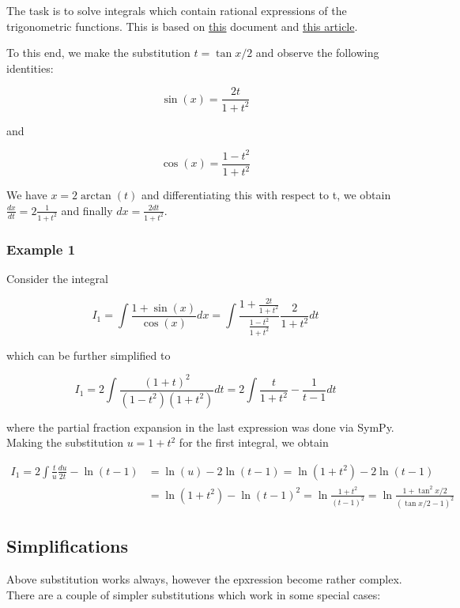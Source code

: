 
The task is to solve integrals which contain rational expressions of the
trigonometric functions. This is based on
\href{http://planetmath.org/sites/default/files/texpdf/39380.pdf}{this}
document and
\href{https://en.wikipedia.org/wiki/Tangent_half-angle_substitution}{this
article}.

To this end, we make the substitution \(t = \tan x/2\) and observe the
following identities:

\[
\sin(x) = \frac{2t}{1+t^2}
\]

and

\[
\cos(x) = \frac{1-t^2}{1+t^2}
\]

We have \(x = 2 \arctan(t)\) and differentiating this with respect to t,
we obtain \(\frac{dx}{dt} = 2 \frac{1}{1+t^2}\) and finally
\(dx = \frac{2 dt}{1+t^2}\).

\subsubsection{Example 1}

Consider the integral

\[
I_1 = \int \frac{1+\sin(x)}{\cos(x)} dx = \int\frac{1+\frac{2t}{1+t^2}}{\frac{1-t^2}{1+t^2}} \frac{2}{1+t^2}dt
\]

which can be further simplified to

\[
I_1 = 2 \int \frac{(1+t)^2}{(1-t^2)(1+t^2)} dt = 2 \int \frac{t}{1+t^2} - \frac{1}{t-1} dt
\]

where the partial fraction expansion in the last expression was done via
SymPy. Making the substitution \(u=1+t^2\) for the first integral, we
obtain

\begin{align*}
I_1 = 2 \int\frac{t}{u} \frac{du}{2t} - \ln(t-1) & = \ln(u) - 2\ln(t-1) = \ln(1+t^2) - 2\ln(t-1) \\ &= \ln(1+t^2) - \ln(t-1)^2 = \ln\frac{1+t^2}{(t-1)^2} = \ln \frac{1+\tan^2 x/2}{(\tan x/2 - 1)^2}
\end{align*}

\subsection{Simplifications}

Above substitution works always, however the epxression become rather
complex. There are a couple of simpler substitutions which work in some
special cases:

